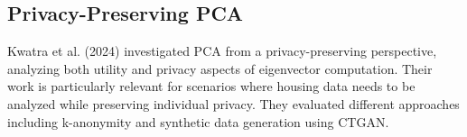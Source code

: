 \documentclass[a4paper, 11pt]{article}
\begin{document}
\subsection{Privacy-Preserving PCA}
Kwatra et al. (2024) investigated PCA from a privacy-preserving perspective, analyzing both utility and privacy aspects of eigenvector computation. Their work is particularly relevant for scenarios where housing data needs to be analyzed while preserving individual privacy. They evaluated different approaches including k-anonymity and synthetic data generation using CTGAN.

% 
% 
\end{document}
